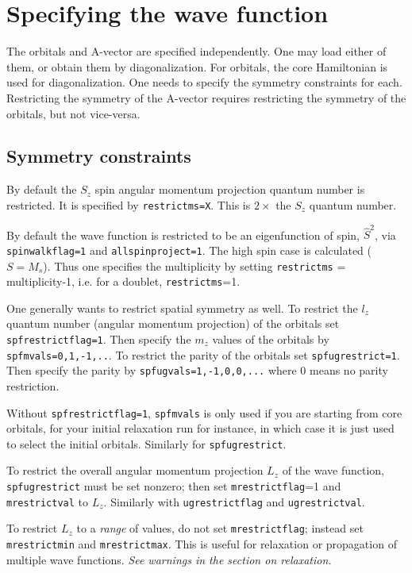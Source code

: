 \documentclass[10pt,leqno, oneside]{book}
\begin{document}
\section{Specifying the wave function}

The orbitals and A-vector are specified independently.  One may load either of them, or obtain them by diagonalization.
For orbitals, the core Hamiltonian is used for diagonalization.  One needs to specify the symmetry constraints for each.
Restricting the symmetry of the A-vector requires restricting the symmetry of the orbitals, but not vice-versa.

\subsection{Symmetry constraints}


By default the $S_z$ spin angular momentum projection quantum number is restricted.  It is specified by \verb#restrictms=X#.  This is $2\times$ the $S_z$ quantum number.  

By default the wave function is restricted to be an eigenfunction of spin, $\hat{S}^2$, via \verb#spinwalkflag=1# and \verb#allspinproject=1#.  
The high spin case is calculated ($S=M_s$).  Thus one specifies the multiplicity by setting \verb#restrictms# = multiplicity-1, i.e. for a doublet, \verb#restrictms#=1.

One generally wants to restrict spatial symmetry as well.  
To restrict the $l_z$ quantum number (angular momentum projection) of the orbitals set \verb#spfrestrictflag=1#.  
Then specify the $m_z$ values of the orbitals by \verb#spfmvals=0,1,-1,..#.
To restrict the parity of the orbitals set \verb#spfugrestrict=1#.  Then specify the parity by \verb#spfugvals=1,-1,0,0,...#
where 0 means no parity restriction.  

Without \verb#spfrestrictflag=1#, \verb#spfmvals# is only used if you are starting
from core orbitals, for your initial relaxation run for instance, in which case it is just used to select the initial orbitals.
Similarly for \verb#spfugrestrict#.

To restrict the overall angular momentum projection $L_z$ of the wave function, \verb#spfugrestrict# must be set nonzero;
then set \verb#mrestrictflag#=1 and \verb#mrestrictval# to $L_z$.  Similarly with \verb#ugrestrictflag# and \verb#ugrestrictval#.

To restrict $L_z$ to a \textit{range} of values, do not set \verb#mrestrictflag#; instead set \verb#mrestrictmin# and \verb#mrestrictmax#.  This is useful for relaxation
or propagation of multiple wave functions. \textit{See warnings in the section on relaxation.}
\end{document}
